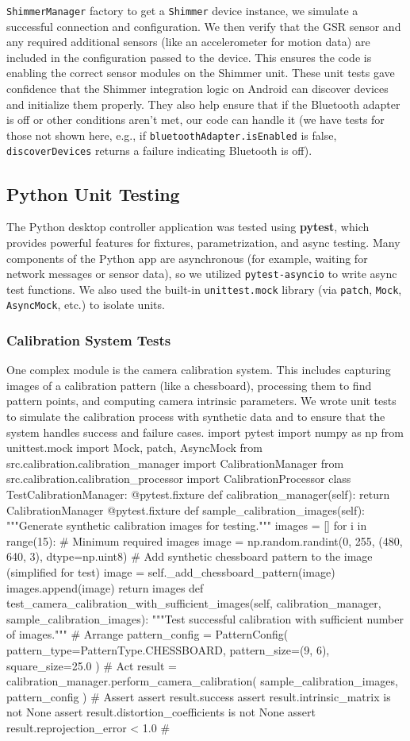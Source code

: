 \texttt{ShimmerManager} factory to get a \texttt{Shimmer} device instance, we simulate a successful connection and configuration. We then verify that the GSR sensor and any required additional sensors (like an accelerometer for motion data) are included in the configuration passed to the device. This ensures the code is enabling the correct sensor modules on the Shimmer unit. These unit tests gave confidence that the Shimmer integration logic on Android can discover devices and initialize them properly. They also help ensure that if the Bluetooth adapter is off or other conditions aren't met, our code can handle it (we have tests for those not shown here, e.g., if \texttt{bluetoothAdapter.isEnabled} is false, \texttt{discoverDevices} returns a failure indicating Bluetooth is off). \subsection{Python Unit Testing} The Python desktop controller application was tested using \textbf{pytest}, which provides powerful features for fixtures, parametrization, and async testing. Many components of the Python app are asynchronous (for example, waiting for network messages or sensor data), so we utilized \texttt{pytest-asyncio} to write async test functions. We also used the built-in \texttt{unittest.mock} library (via \texttt{patch}, \texttt{Mock}, \texttt{AsyncMock}, etc.) to isolate units. \subsubsection{Calibration System Tests} One complex module is the camera calibration system. This includes capturing images of a calibration pattern (like a chessboard), processing them to find pattern points, and computing camera intrinsic parameters. We wrote unit tests to simulate the calibration process with synthetic data and to ensure that the system handles success and failure cases. import pytest import numpy as np from unittest.mock import Mock, patch, AsyncMock from src.calibration.calibration_manager import CalibrationManager from src.calibration.calibration_processor import CalibrationProcessor class TestCalibrationManager: @pytest.fixture def calibration_manager(self): return CalibrationManager @pytest.fixture def sample_calibration_images(self): """Generate synthetic calibration images for testing.""" images = [] for i in range(15): # Minimum required images image = np.random.randint(0, 255, (480, 640, 3), dtype=np.uint8) # Add synthetic chessboard pattern to the image (simplified for test) image = self._add_chessboard_pattern(image) images.append(image) return images def test_camera_calibration_with_sufficient_images(self, calibration_manager, sample_calibration_images): """Test successful calibration with sufficient number of images.""" # Arrange pattern_config = PatternConfig( pattern_type=PatternType.CHESSBOARD, pattern_size=(9, 6), square_size=25.0 ) # Act result = calibration_manager.perform_camera_calibration( sample_calibration_images, pattern_config ) # Assert assert result.success assert result.intrinsic_matrix is not None assert result.distortion_coefficients is not None assert result.reprojection_error < 1.0 # 